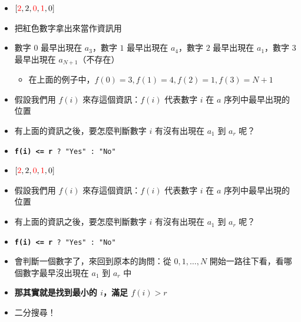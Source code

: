 \documentclass[standalone]{beamer}
\begin{document}
\begin{frame}[fragile]{}
  \begin{itemize}
    \item $[{\color{red} 2}, 2, {\color{red} 0}, {\color{red} 1}, 0]$
    \item 把紅色數字拿出來當作資訊用
    \item 數字 $0$ 最早出現在 $a_3$，數字 $1$ 最早出現在 $a_4$，數字 $2$ 最早出現在 $a_1$，數字 $3$ 最早出現在 $a_{N + 1}$（不存在）
      \begin{itemize}
        \item 在上面的例子中，$f(0) = 3, f(1) = 4, f(2) = 1, f(3) = N + 1$
      \end{itemize}
    \item 假設我們用 $f(i)$ 來存這個資訊：$f(i)$ 代表數字 $i$ 在 $a$ 序列中最早出現的位置
    \item 有上面的資訊之後，要怎麼判斷數字 $i$ 有沒有出現在 $a_1$ 到 $a_r$ 呢？
    \item \texttt{\textbf{f(i) <= r} ? "Yes" : "No"}
  \end{itemize}
\end{frame}

\begin{frame}[fragile]{}
  \begin{itemize}
    \item $[{\color{red} 2}, 2, {\color{red} 0}, {\color{red} 1}, 0]$
    \item 假設我們用 $f(i)$ 來存這個資訊：$f(i)$ 代表數字 $i$ 在 $a$ 序列中最早出現的位置
    \item 有上面的資訊之後，要怎麼判斷數字 $i$ 有沒有出現在 $a_1$ 到 $a_r$ 呢？
    \item \texttt{\textbf{f(i) <= r} ? "Yes" : "No"}
    \item 會判斷一個數字了，來回到原本的詢問：從 $0, 1, \dots, N$ 開始一路往下看，看哪個數字最早沒出現在 $a_1$ 到 $a_r$ 中
    \item \textbf{那其實就是找到最小的 $i$，滿足 $f(i) > r$}
    \item 二分搜尋！
  \end{itemize}
\end{frame}
\end{document}

